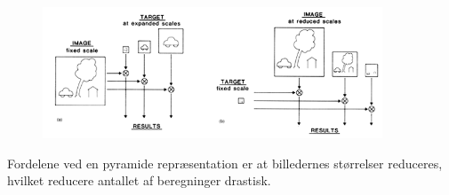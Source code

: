 \begin{figure}[H]
    \centering
    \includegraphics[width=0.90\textwidth]{fig/38.png}
     \vspace{-1em}
    \begin{center}    
       \caption{\textcolor{gray}{\footnotesize \textit{ }}}
    \label{fig:scalerepdiff}
     \end{center}
     \vspace{-2.5em}
  \end{figure} \noindent
Fordelene ved en pyramide repræsentation er at  billedernes størrelser reduceres, hvilket reducere antallet af beregninger drastisk.